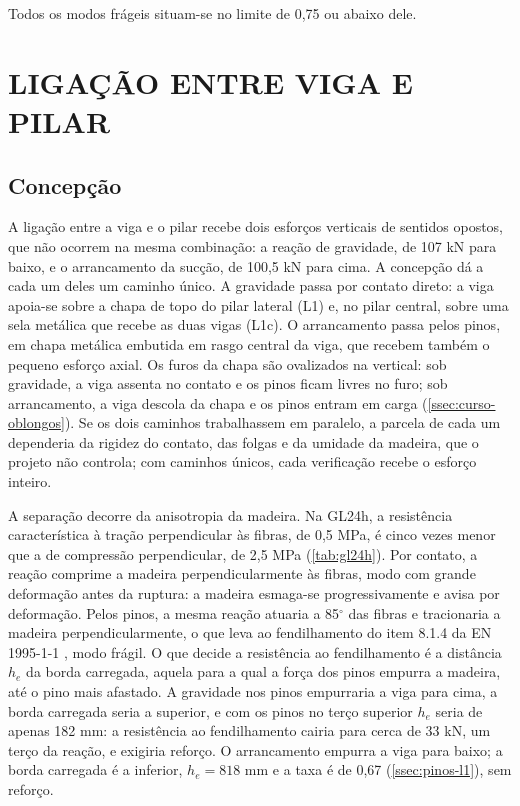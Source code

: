 Todos os modos frágeis situam-se no limite de 0,75 ou abaixo dele.

\section{LIGAÇÃO ENTRE VIGA E PILAR}\label{sec:ligacao-viga-pilar}

\subsection{Concepção}\label{ssec:concepcao-l1}

A ligação entre a viga e o pilar recebe dois esforços verticais de sentidos
opostos, que não ocorrem na mesma combinação: a reação de gravidade, de 107 kN
para baixo, e o arrancamento da sucção, de 100,5 kN para cima. A concepção dá a
cada um deles um caminho único. A gravidade passa por contato direto: a viga
apoia-se sobre a chapa de topo do pilar lateral (L1) e, no pilar central, sobre
uma sela metálica que recebe as duas vigas (L1c). O arrancamento passa pelos
pinos, em chapa metálica embutida em rasgo central da viga, que recebem também o
pequeno esforço axial. Os furos da chapa são ovalizados na vertical: sob
gravidade, a viga assenta no contato e os pinos ficam livres no furo; sob
arrancamento, a viga descola da chapa e os pinos entram em carga
(\autoref{ssec:curso-oblongos}). Se os dois caminhos trabalhassem em paralelo, a
parcela de cada um dependeria da rigidez do contato, das folgas e da umidade da
madeira, que o projeto não controla; com caminhos únicos, cada verificação recebe
o esforço inteiro.

A separação decorre da anisotropia da madeira. Na GL24h, a resistência
característica à tração perpendicular às fibras, de 0,5 MPa, é cinco vezes
menor que a de compressão perpendicular, de 2,5 MPa (\autoref{tab:gl24h}). Por
contato, a reação comprime a madeira perpendicularmente às fibras, modo com grande deformação antes da ruptura:
a madeira esmaga-se progressivamente e avisa por deformação. Pelos pinos, a
mesma reação atuaria a 85$^{\circ}$ das fibras e tracionaria a madeira
perpendicularmente, o que leva ao fendilhamento do item 8.1.4 da
EN 1995-1-1 \cite{EN1995-1-1:2004}, modo frágil. O que decide a resistência ao
fendilhamento é a distância $h_e$ da borda carregada, aquela para a qual a força
dos pinos empurra a madeira, até o pino mais afastado. A gravidade nos pinos
empurraria a viga para cima, a borda carregada seria a superior, e com os pinos
no terço superior $h_e$ seria de apenas 182 mm: a resistência ao fendilhamento
cairia para cerca de 33 kN, um terço da reação, e exigiria reforço. O
arrancamento empurra a viga para baixo; a borda carregada é a inferior,
$h_e = 818$ mm e a taxa é de 0,67 (\autoref{ssec:pinos-l1}), sem reforço.


